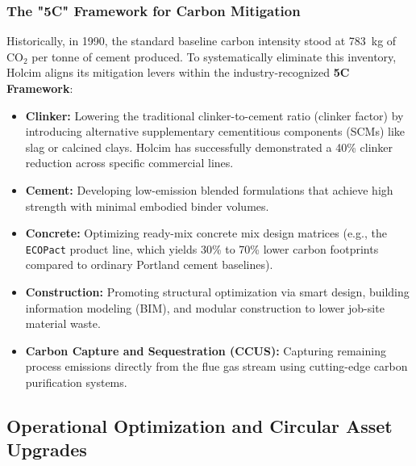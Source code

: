 \subsubsection{The "5C" Framework for Carbon Mitigation}
Historically, in 1990, the standard baseline carbon intensity stood at \num{783}~\si{\kilogram} of $\text{CO}_2$ per tonne of cement produced. To systematically eliminate this inventory, Holcim aligns its mitigation levers within the industry-recognized \textbf{5C Framework}:
\begin{itemize}
    \item \textbf{Clinker:} Lowering the traditional clinker-to-cement ratio (clinker factor) by introducing alternative supplementary cementitious components (SCMs) like slag or calcined clays. Holcim has successfully demonstrated a \num{40}\% clinker reduction across specific commercial lines.
    \item \textbf{Cement:} Developing low-emission blended formulations that achieve high strength with minimal embodied binder volumes.
    \item \textbf{Concrete:} Optimizing ready-mix concrete mix design matrices (e.g., the \MakeLowercase{\texttt{ECOPact}} product line, which yields \num{30}\% to \num{70}\% lower carbon footprints compared to ordinary Portland cement baselines).
    \item \textbf{Construction:} Promoting structural optimization via smart design, building information modeling (BIM), and modular construction to lower job-site material waste.
    \item \textbf{Carbon Capture and Sequestration (CCUS):} Capturing remaining process emissions directly from the flue gas stream using cutting-edge carbon purification systems.
\end{itemize}

\subsection{Operational Optimization and Circular Asset Upgrades}

